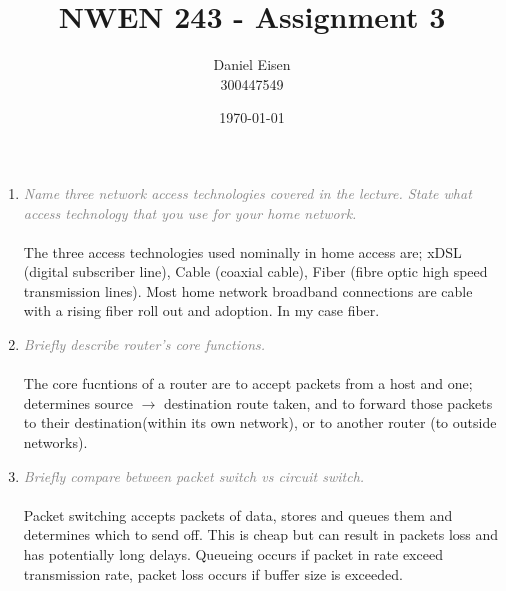 \documentclass[a4paper,11pt]{article}
\title{NWEN 243 - Assignment 3}
\author{Daniel Eisen \\ 300447549}
\date{\today}
\begin{document}
\maketitle

\begin{enumerate}
\item
\textcolor{gray}{\textit{Name three network access technologies covered in the lecture.
State what access technology that you use for your home network.}}\\ \\
The three access technologies used nominally in home access are;
xDSL (digital subscriber line), Cable (coaxial cable), Fiber (fibre optic high
speed transmission lines). Most home network broadband connections are cable with
a rising fiber roll out and adoption. In my case fiber.
\item
\textcolor{gray}{\textit{Briefly describe router’s core functions.}}\\ \\
The core fucntions of a router are to accept packets from a host and one; determines source $\rightarrow$ destination route taken, and to forward those packets to their destination(within its own network), or to another router (to outside networks).
\item
\textcolor{gray}{\textit{Briefly compare between packet switch vs circuit switch.}}\\ \\
Packet switching accepts packets of data, stores and queues them and determines which to send off.
This is cheap but can result in packets loss and has potentially long delays. Queueing occurs if packet in rate exceed transmission rate, packet loss occurs if buffer size is exceeded.


\end{enumerate}
\end{document}
